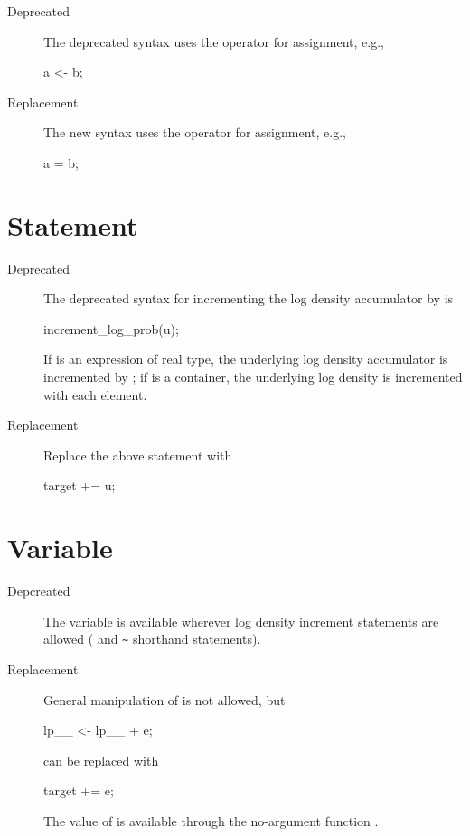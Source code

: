\begin{description}
\item[Deprecated] The deprecated syntax uses the operator \code{<-}
  for assignment, e.g., 
\begin{stancode}
a <- b;
\end{stancode}
\item[Replacement] The new syntax uses the operator \code{=} for
  assignment, e.g.,
\begin{stancode}
a = b;
\end{stancode}
\end{description}

\section{ Statement}

\begin{description}
\item[Deprecated] The deprecated syntax for incrementing the log
  density accumulator by  is
\begin{stancode}
increment_log_prob(u);
\end{stancode}
If  is an expression of real type, the underlying log density
accumulator is incremented by ;  if  is a container,
the underlying log density is incremented with each element.
\item[Replacement] Replace the above statement with
\begin{stancode}
target += u;
\end{stancode}
\end{description}

\section{ Variable}

\begin{description}
\item[Depcreated]
The variable  is available wherever log density increment
statements are allowed ( and \Verb|~| shorthand
statements).
\item[Replacement]
General manipulation of  is not allowed, but
\begin{stancode}
lp__ <- lp__ + e;
\end{stancode}
%
can be replaced with
%
\begin{stancode}
target += e;
\end{stancode}
%
The value of  is available through the no-argument
function .
\end{description}


